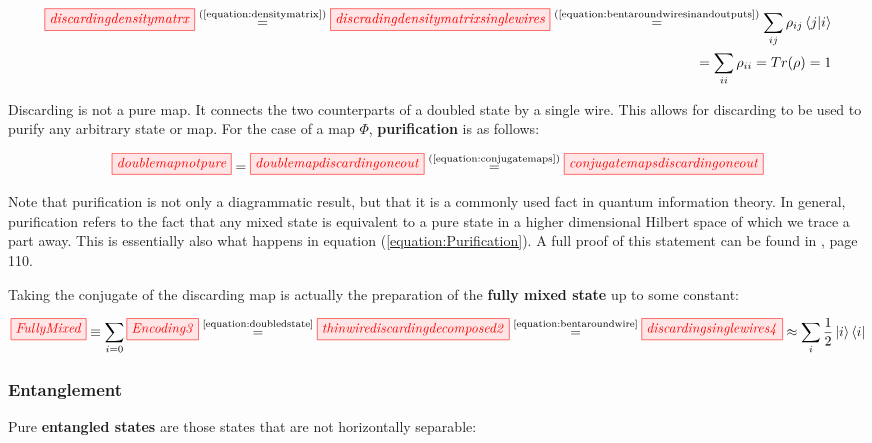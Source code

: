 \documentclass[]{article}
\newcommand{\equaltext}[1]{\ensuremath{\stackrel{\text{#1}}{=}}}
\begin{document}
\begin{equation}
\label{equation:discardingstate}
\begin{split}
\tikzfig{discardingdensitymatrx} \equaltext{(\ref{equation:densitymatrix})} \tikzfig{discradingdensitymatrixsinglewires} \equaltext{(\ref{equation:bentaroundwiresinandoutputs})} \sum\limits_{ij} \rho_{ij} \bra{j}\ket{i} \\ = \sum\limits_{ii} \rho_{ii} = Tr(\rho) = 1
\end{split}
\end{equation}

Discarding is not a pure map. It connects the two counterparts of a doubled state by a single wire. This allows for discarding to be used to purify any arbitrary state or map. For the case of a map $\Phi$, \textbf{purification} is as follows:

\begin{equation}
\label{equation:Purification}
\tikzfig{doublemapnotpure} = \tikzfig{doublemapdiscardingoneout} \equaltext{(\ref{equation:conjugatemaps})} \tikzfig{conjugatemapsdiscardingoneout}
\end{equation}

Note that purification is not only a diagrammatic result, but that it is a commonly used fact in quantum information theory. In general, purification refers to the fact that any mixed state is equivalent to a pure state in a higher dimensional Hilbert space of which we trace a part away. This is essentially also what happens in equation (\ref{equation:Purification}). A full proof of this statement can be found in \cite{Nielsen2011}, page 110.

Taking the conjugate of the discarding map is actually the preparation of the \textbf{fully mixed state} up to some constant:

\begin{equation}
	\label{equation:FullyMixed}
	\tikzfig{FullyMixed} \equiv \sum\limits_{i=0} \tikzfig{Encoding3} \equaltext{\ref{equation:doubledstate}} \tikzfig{thinwirediscardingdecomposed2}  \equaltext{\ref{equation:bentaroundwire}} \tikzfig{discardingsinglewires4} \approx \sum\limits_{i} \frac{1}{2} \ket{i} \bra{i}
\end{equation}

\subsubsection{Entanglement}
\label{entanglement}
Pure \textbf{entangled states} are those states that are not horizontally separable: 
\end{document}
